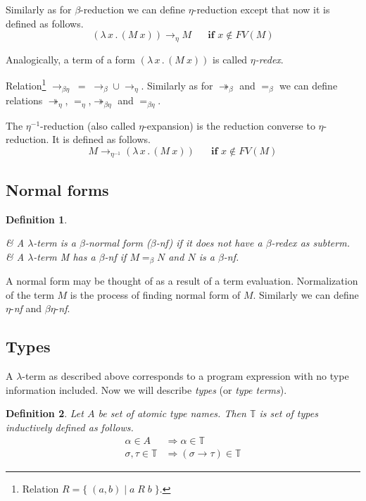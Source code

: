 \documentclass{sig-alternate}
\newtheorem{definition}{Definition}
\newcommand{\lterm}{$\lambda$-term\xspace}
\newcommand{\then}{\Rightarrow\xspace}
\newcommand{\lamb}[2]{( \lambda \, #1 \, . \, #2 )}
\newcommand{\bbarr}{\twoheadrightarrow_\beta}
\newcommand{\barr}{\rightarrow_\beta}
\newcommand{\beq}{=_\beta}
\newcommand{\eearr}{\twoheadrightarrow_\eta}
\newcommand{\earr}{\rightarrow_\eta}
\newcommand{\eeq}{=_\eta}
\newcommand{\bearr}{\rightarrow_{\beta\eta}}
\newcommand{\bbeearr}{\twoheadrightarrow_{\beta\eta}}
\newcommand{\beeq}{=_{\beta\eta}}
\newcommand{\bnf}{$\beta$-\textit{nf}\xspace}
\newcommand{\enf}{$\eta$-\textit{nf}\xspace}
\newcommand{\benf}{$\beta\eta$-\textit{nf}\xspace}
\newcommand{\ar}{\rightarrow\xspace}
\newcommand{\T}{\mathbb{T}\xspace}
\newcommand{\eArrow}{\rightarrow_\eta\xspace}
\newcommand{\eeArrow}{\rightarrow_{\eta^{-1}}\xspace}
\begin{document}
Similarly as for $\beta$-reduction we can define $\eta$-reduction except that now it is defined as follows.  
$$\lamb{x}{(M~x)} \eArrow M \textbf{ ~~~~if } x \not\in FV(M) $$

Analogically, a term of a form $\lamb{x}{(M~x)}$ is called 
\textit{$\eta$-redex}.

Relation\footnote{Relation $R = \{\;(a,b)\;|\;a\;R\;b\;\}$.} $\bearr\;=\;\barr \cup \earr$.
Similarly as for $\bbarr$ and $\beq$ we can define relations 
$\eearr$, $\eeq$,$\bbeearr$ and $\beeq$.

The $\eta^{-1}$-reduction (also called $\eta$-expansion) is 
the reduction converse to $\eta$-reduction.
It is defined as follows.  
$$M \eeArrow \lamb{x}{(M~x)} \textbf{ ~~~~if } x \not\in FV(M) $$


\subsection{Normal forms}
\begin{definition}~

\begin{easylist}[enumerate]
& A \lterm is a \textit{$\beta$-normal form} (\bnf) 
if it does not have a $\beta$-redex as subterm.
& A \lterm M \textit{has} a \bnf if $M \beq N$
and $N$ is a \bnf.
\end{easylist}
\end{definition}

A normal form may be thought of as a result of a term evaluation. 
Normalization of the term $M$ is the process of finding normal form of $M$. 
Similarly we can define \enf and \benf.

\subsection{Types}

A \lterm as described above
corresponds to a program expression with no type information
included. Now we will describe \textit{types} (or \textit{type terms}).

\begin{definition}
Let $A$ be set of {\it atomic type names}. 
Then $\mathbb{T}$ is set of {\it types} inductively defined as follows.
\begin{align*}
\alpha      \in A  &\then   \alpha \in \T \\
\sigma,\tau \in \T &\then ( \sigma \ar  \tau ) \in \T 
\end{align*}
\end{definition}
\end{document}

